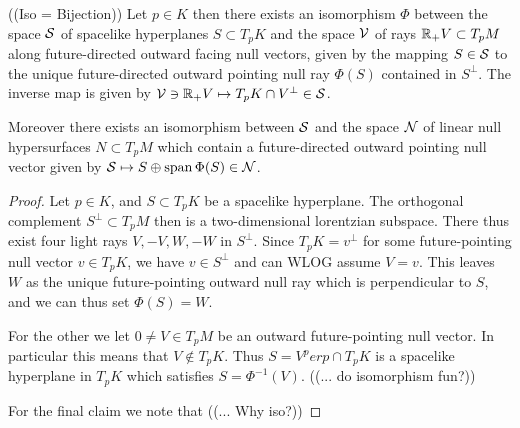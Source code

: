 \begin{lemma}\label{lem:dirreconstr}
    ((Iso = Bijection))
Let $p\in K$ then there exists an isomorphism $\Phi$ between the space $\mathcal{S}$ of spacelike hyperplanes $S\subset T_pK$ and the space $\mathcal{V}$ of rays $\mathbb{R}_+V\subset T_pM$ along future-directed outward facing null vectors, given by the mapping $S\in \mathcal{S}$ to the unique future-directed outward pointing null ray $\Phi(S)$ contained in $S^\perp$. The inverse map is given by $\mathcal{V}\ni \mathbb{R}_+V \mapsto T_pK \cap V^\perp\in \mathcal{S}$.

Moreover there exists an isomorphism between $\mathcal{S}$ and the space $\mathcal{N}$ of linear null hypersurfaces $N\subset T_pM$ which contain a future-directed outward pointing null vector given by $\mathcal{S}\mapsto S\oplus \operatorname{span} \Phi(S)\in \mathcal{N}$.
\end{lemma}
\begin{proof}
    Let $p\in K$, and $S\subset T_pK$ be a spacelike hyperplane. The orthogonal complement $S^\perp\subset T_pM$ then is a two-dimensional lorentzian subspace. There thus exist four light rays $V,-V,W,-W$ in $S^\perp$. Since $T_pK=v^\perp$ for some future-pointing null vector $v\in T_pK$, we have $v\in S^\perp$ and can WLOG assume $V=v$. This leaves $W$ as the unique future-pointing outward null ray which is perpendicular to $S$, and we can thus set $\Phi(S)=W$.

    For the other we let $0\neq V\in T_pM$ be an outward future-pointing null vector. In particular this means that $V\notin T_pK$. Thus $S=V^perp\cap T_pK$ is a spacelike hyperplane in $T_pK$ which satisfies $S=\Phi^{-1}(V)$. ((... do isomorphism fun?))

    For the final claim we note that ((... Why iso?))
\end{proof}

